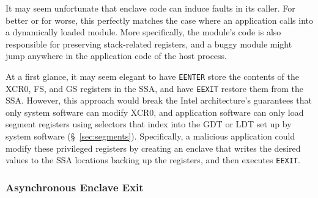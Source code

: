 It may seem unfortunate that enclave code can induce faults in its caller.
For better or for worse, this perfectly matches the case where an application
calls into a dynamically loaded module. More specifically, the module's code is
also responsible for preserving stack-related registers, and a buggy module
might jump anywhere in the application code of the host process.

At a first glance, it may seem elegant to have \texttt{EENTER} store the
contents of the XCR0, FS, and GS registers in the SSA, and have \texttt{EEXIT}
restore them from the SSA. However, this approach would break the Intel
architecture's guarantees that only system software can modify XCR0, and
application software can only load segment registers using selectors that index
into the GDT or LDT set up by system software (\S~\ref{sec:segments}).
Specifically, a malicious application could modify these privileged registers
by creating an enclave that writes the desired values to the SSA locations
backing up the registers, and then executes \texttt{EEXIT}.


\subsubsection{Asynchronous Enclave Exit}
\label{sec:sgx_aex}
\label{sec:sgx_eresume}


